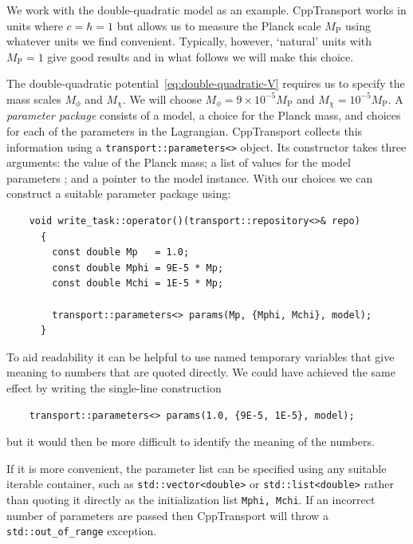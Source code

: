 \documentclass[11pt,a4paper]{article}
\newcommand{\Mp}{M_{\mathrm{P}}}
\newcommand{\packagefont}{\sffamily}
\newcommand{\CppTransport}{{\packagefont CppTransport}}
\newcommand{\semibold}[1]{{\fontseries{b}\selectfont{#1}}}
\newcommand{\para}[1]{\par\vspace{2mm}\noindent\semibold{{#1.}---}\ignorespaces}
\begin{document}
\para{Specifying parameters}
We work with the double-quadratic model as an example.
{\CppTransport} works in units where $c=\hbar=1$ but allows us
to measure the Planck scale $\Mp$ using whatever units we find
convenient.
Typically, however, `natural' units with $\Mp=1$ give good results
and in what follows we will make this choice.

The double-quadratic potential~\eqref{eq:double-quadratic-V}
requires us to specify the mass scales $M_\phi$ and $M_\chi$.
We will choose $M_\phi = 9 \times 10^{-5} \Mp$
and $M_\chi = 10^{-5} \Mp$.
A \emph{parameter package} consists of a model,
a choice for the Planck mass,
and choices for each of the parameters in the Lagrangian.
{\CppTransport} collects this information using a
\texttt{transport::parameters<>} object.
Its constructor takes three arguments:
the value of the Planck mass;
a list of values for the model parameters
\semibold{in the same order they were declared in the model
description file};
and a pointer to the model instance.
With our choices we can construct a suitable parameter package using:
\begin{verbatim}
	void write_task::operator()(transport::repository<>& repo)
	  {
	    const double Mp   = 1.0;
	    const double Mphi = 9E-5 * Mp;
	    const double Mchi = 1E-5 * Mp;
	
	    transport::parameters<> params(Mp, {Mphi, Mchi}, model);	
	  }
\end{verbatim}
To aid readability it can be helpful to use named temporary variables
that give meaning to numbers that are quoted directly.
We could have achieved the same effect by writing
the single-line construction
\begin{verbatim}
	transport::parameters<> params(1.0, {9E-5, 1E-5}, model);	
\end{verbatim}
but it would then be more difficult to identify the meaning of the
numbers.

If it is more convenient,
the parameter list can be specified using any suitable iterable
container, such as
\texttt{std::vector<double>}
or
\texttt{std::list<double>}
rather than quoting it directly as the initialization list
\texttt{{Mphi, Mchi}}.
If an incorrect number of parameters are passed
then {\CppTransport} will throw
a \texttt{std::out_of_range} exception.
\end{document}
